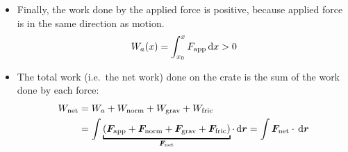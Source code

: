 \begin{example}
\begin{itemize}[itemsep=6pt]
    component of gravity along the direction of motion is in the opposite
    direction. Gravitational force is also a constant force, and integration is
    not necessary:
    \begin{equation*}
      W_\text{grav}=\int\bm F_\text{grav}\cdot\dl{\bm r}
      =\int F_\text{grav}\cos(\phi+\SI{90}{\degree})\dl x
      =mg\Delta x\cos(\phi+\SI{90}{\degree})<0
    \end{equation*}
  \item Finally, the work done by the applied force is positive, because
    applied force is in the same direction as motion.
    \begin{equation*}
      W_a(x)=\int_{x_0}^x F_\text{app}\dl x>0
    \end{equation*}
  \item The total work (i.e.\ the net work) done on the crate is the sum of
    the work done by each force:
    \begin{align*}
      W_\text{net} &=W_a+W_\text{norm}+W_\text{grav} +W_\text{fric}\\
      &=\int\underbracket[1pt]{
        \left(\bm F_\text{app}+\bm F_\text{norm}+\bm F_\text{grav}+
        \bm F_\text{fric}\right)
      }_{\bm F_\text{net}}\cdot\dl{\bm r}=\int\bm F_\text{net}\cdot\dl{\bm r}
    \end{align*}
  \end{itemize}
\end{example}



